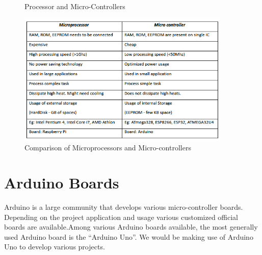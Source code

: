 \begin{figure}
    \centering
    \qquad
    \caption{Processor and Micro-Controllers}
\end{figure}

\begin{figure}
    \includegraphics[width=4in]{Tables/Intro_Arduino/compare_ard_proc.png}
    \caption[Microprocessors VS Micro-controllers]{Comparison of Microprocessors and Micro-controllers}
    \label{fig:compare_micro_proc}
\end{figure}

\section{Arduino Boards}
\par Arduino is a large community that develops various micro-controller boards. Depending on the project application and usage various customized official boards are available.Among various Arduino boards available, the most generally used Arduino board is the “Arduino Uno”. We would be making use of Arduino Uno to develop various projects.

